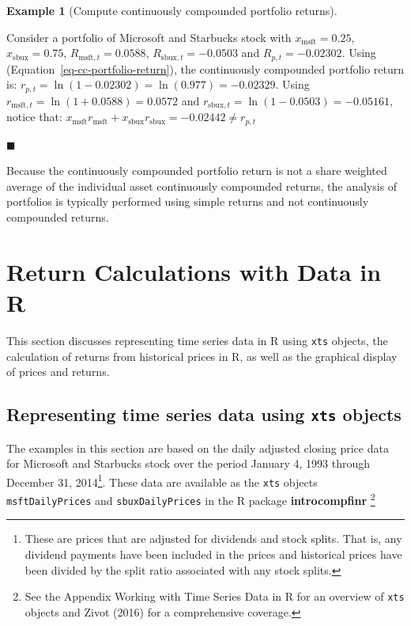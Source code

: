 \documentclass[
  letterpaper,
  DIV=11,
  numbers=noendperiod]{scrreprt}
\theoremstyle{definition}
\theoremstyle{definition}
\newtheorem{example}{Example}[chapter]
\theoremstyle{remark}
\begin{document}
\begin{example}[Compute continuously compounded portfolio
returns]\protect\hypertarget{exm-example0117}{}\label{exm-example0117}

Consider a portfolio of Microsoft and Starbucks stock with
\(x_{\textrm{msft}}=0.25\), \(x_{\textrm{sbux}}=0.75\),
\(R_{\textrm{msft},t}=0.0588\), \(R_{\textrm{sbux},t}=-0.0503\) and
\(R_{p,t}=-0.02302\). Using (Equation~\ref{eq-cc-portfolio-return}), the
continuously compounded portfolio return is:
\(r_{p,t}=\ln(1-0.02302)=\ln(0.977)=-0.02329.\) Using
\(r_{\textrm{msft},t}=\ln(1+0.0588)=0.0572\) and
\(r_{\textrm{sbux},t}=\ln(1-0.0503)=-0.05161,\) notice that:
\(x_{\textrm{msft}}r_{\textrm{msft}}+x_{\textrm{sbux}}r_{\textrm{sbux}}=-0.02442\neq r_{p,t}\)

\hfill{}\(\blacksquare\)

\end{example}

Because the continuously compounded portfolio return is not a share
weighted average of the individual asset continuously compounded
returns, the analysis of portfolios is typically performed using simple
returns and not continuously compounded returns.

\hypertarget{sec-ReturnCalculationsR}{%
\section{Return Calculations with Data in
R}\label{sec-ReturnCalculationsR}}

This section discusses representing time series data in R using
\texttt{xts} objects, the calculation of returns from historical prices
in R, as well as the graphical display of prices and returns.

\hypertarget{representing-time-series-data-using-xts-objects}{%
\subsection{\texorpdfstring{Representing time series data using
\texttt{xts}
objects}{Representing time series data using xts objects}}\label{representing-time-series-data-using-xts-objects}}

The examples in this section are based on the daily adjusted closing
price data for Microsoft and Starbucks stock over the period January 4,
1993 through December 31, 2014\footnote{These are prices that are
  adjusted for dividends and stock splits. That is, any dividend
  payments have been included in the prices and historical prices have
  been divided by the split ratio associated with any stock splits.}.
These data are available as the \texttt{xts} objects
\texttt{msftDailyPrices} and \texttt{sbuxDailyPrices} in the R package
\textbf{introcompfinr} \footnote{See the Appendix Working with Time
  Series Data in R for an overview of \texttt{xts} objects and Zivot
  (2016) for a comprehensive coverage.}
\end{document}
